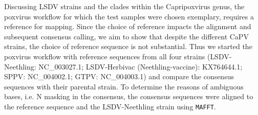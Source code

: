 Discussing \ac{LSDV} strains and the clades within the Capripoxvirus genus, the poxvirus workflow for which the test samples were chosen exemplary, requires a reference for mapping. Since the choice of reference impacts the alignment and subsequent consensus calling, we aim to show that despite the different \ac{CaPV} strains, the choice of reference sequence is not substantial. Thus we started the poxvirus workflow with reference sequences from all four strains (\ac{LSDV}-Neethling: NC\_003027.1; \ac{LSDV}-Herbivac (Neethling-vaccine): KX764644.1; SPPV: NC\_004002.1; \ac{GTPV}: NC\_004003.1) and compare the consensus sequences with their parental strain. %
To determine the reasons of ambiguous bases, i.e. N masking in the consensus, the consensus sequences were aligned to the reference sequence and the \ac{LSDV}-Neethling strain using \texttt{\acs{MAFFT}}.\\

